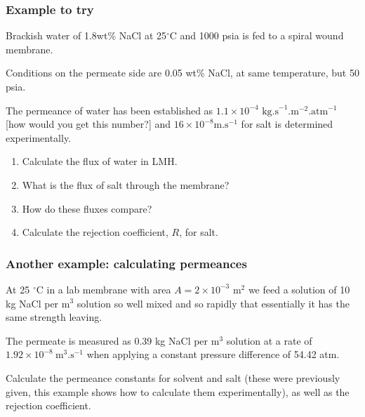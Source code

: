 \begin{frame}\frametitle{Example to try}
	Brackish water of 1.8wt\% NaCl at 25$^{\circ}\text{C}$ and 1000 psia is fed to a spiral wound membrane.

	\vspace{6pt}
	Conditions on the permeate side are 0.05 wt\% NaCl, at same temperature, but 50 psia.

	\vspace{6pt}
	The permeance of water has been established as $1.1 \times 10^{-4} \text{~kg.s}^{-1}\text{.m}^{-2}\text{.atm}^{-1}$ [how would you get this number?] and $16 \times 10^{-8} \text{m.s}^{-1}$ for salt is determined experimentally.

	
			\begin{enumerate}
				\item	Calculate the flux of water in LMH.
				\item	What is the flux of salt through the membrane?
				\item	How do these fluxes compare?
				\item	Calculate the rejection coefficient, $R$, for salt.
			\end{enumerate}

			
\end{frame}

\begin{frame}\frametitle{Another example: calculating permeances}
	At 25 $^\circ$C in a lab membrane with area $A = 2 \times 10^{-3}$ $\text{m}^{2}$ we feed a solution of 10 kg NaCl per m$^3$ solution so well mixed and so rapidly that essentially it has the same strength leaving.

	\vspace{12pt}
	The permeate is measured as 0.39 kg NaCl per $\text{m}^{3}$ solution at a rate of $1.92 \times 10^{-8}~\text{m}^3\text{.s}^{-1}$ when applying a constant pressure difference of 54.42 atm.

	\vspace{12pt}
	Calculate the permeance constants for solvent and salt (these were previously given, this example shows how to calculate them experimentally), as well as the rejection coefficient.
\end{frame}

